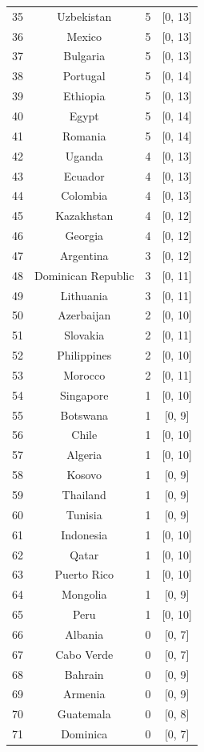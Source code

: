 \documentclass{mcmthesis}
\begin{document}
\begin{longtable}{rccc}
35 & Uzbekistan & 5 & [0, 13] \\
36 & Mexico & 5 & [0, 13] \\
37 & Bulgaria & 5 & [0, 13] \\
38 & Portugal & 5 & [0, 14] \\
39 & Ethiopia & 5 & [0, 13] \\
40 & Egypt & 5 & [0, 14] \\
41 & Romania & 5 & [0, 14] \\
42 & Uganda & 4 & [0, 13] \\
43 & Ecuador & 4 & [0, 13] \\
44 & Colombia & 4 & [0, 13] \\
45 & Kazakhstan & 4 & [0, 12] \\
46 & Georgia & 4 & [0, 12] \\
47 & Argentina & 3 & [0, 12] \\
48 & Dominican Republic & 3 & [0, 11] \\
49 & Lithuania & 3 & [0, 11] \\
50 & Azerbaijan & 2 & [0, 10] \\
51 & Slovakia & 2 & [0, 11] \\
52 & Philippines & 2 & [0, 10] \\
53 & Morocco & 2 & [0, 11] \\
54 & Singapore & 1 & [0, 10] \\
55 & Botswana & 1 & [0, 9] \\
56 & Chile & 1 & [0, 10] \\
57 & Algeria & 1 & [0, 10] \\
58 & Kosovo & 1 & [0, 9] \\
59 & Thailand & 1 & [0, 9] \\
60 & Tunisia & 1 & [0, 9] \\
61 & Indonesia & 1 & [0, 10] \\
62 & Qatar & 1 & [0, 10] \\
63 & Puerto Rico & 1 & [0, 10] \\
64 & Mongolia & 1 & [0, 9] \\
65 & Peru & 1 & [0, 10] \\
66 & Albania & 0 & [0, 7] \\
67 & Cabo Verde & 0 & [0, 7] \\
68 & Bahrain & 0 & [0, 9] \\
69 & Armenia & 0 & [0, 9] \\
70 & Guatemala & 0 & [0, 8] \\
71 & Dominica & 0 & [0, 7] \\

\end{longtable}
\end{document}
